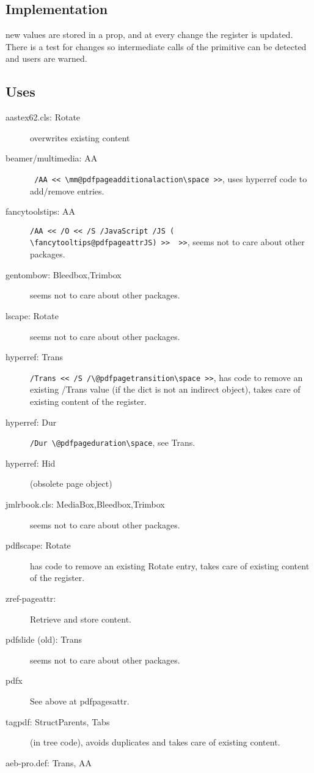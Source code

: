 \documentclass{article}
\begin{document}
\subsection{Implementation}
new values are stored in a prop, and at every change the register is updated. There is a test for changes so intermediate calls of the primitive can be detected and users are warned.

\subsection{Uses}
\begin{description}
  \item[aastex62.cls: Rotate] overwrites existing content
  \item[beamer/multimedia: AA] \verb+ /AA << \mm@pdfpageadditionalaction\space >>+, uses hyperref code to add/remove entries.
  \item[fancytoolstips: AA] \verb+/AA << /O << /S /JavaScript /JS (    \fancytooltips@pdfpageattrJS) >>  >>+, seems not to care about other packages.

  \item[gentombow: Bleedbox,Trimbox] seems not to care about other packages.
  \item[lscape: Rotate] seems not to care about other packages.
  \item[hyperref: Trans] \verb+/Trans << /S /\@pdfpagetransition\space >>+, has code to remove an existing /Trans value (if the dict is not an indirect object), takes care of existing content of the register.

  \item[hyperref: Dur] \verb+/Dur \@pdfpageduration\space+, see Trans.
  \item[hyperref: Hid] (obsolete page object)
  \item[jmlrbook.cls: MediaBox,Bleedbox,Trimbox] seems not to care about other packages.
  \item[pdflscape: Rotate] has code to remove an existing Rotate entry, takes care of existing content of the register.
  \item[zref-pageattr:] Retrieve and store content.
  \item[pdfslide (old): Trans]  seems not to care about other packages.
  \item[pdfx] See above at pdfpagesattr.
  \item[tagpdf: StructParents, Tabs] (in tree code), avoids duplicates and takes care of existing content.
  \item[aeb-pro.def: Trans, AA]
\end{description}
\end{document}
